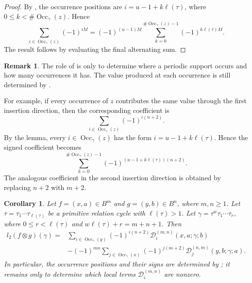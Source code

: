 \documentclass[11pt,a4paper,reqno]{amsart}
\newcommand{\mD}{\mathcal D}
\newcommand{\Occ}{\operatorname{Occ}}
\newcommand{\para}[2]{(#1,#2)}
\theoremstyle{plain}
\newtheorem{corollary}[corollary]{Corollary}
\theoremstyle{definition}
\newtheorem{remark}[remark]{Remark}
\numberwithin{equation}{section}
\begin{document}
	\begin{proof}
		By , the occurrence positions are
		$i=u-1+k\ell(\tau)$, where $0\leq k<\#\Occ_\gamma(z)$.
		Hence
		\[
		\sum_{i\in\Occ_\gamma(z)}(-1)^{iM}
		=
		(-1)^{(u-1)M}
		\sum_{k=0}^{\#\Occ_\gamma(z)-1}
		(-1)^{k\ell(\tau)M}.
		\]
		The result follows by evaluating the final alternating sum.
	\end{proof}
	\begin{remark}
		The role of  is only to determine where a
		periodic support occurs and how many occurrences it has.  The value produced
		at each occurrence is still determined by .
		
		For example, if every occurrence of $z$ contributes the same value through
		the first insertion direction, then the corresponding coefficient is
		\[
		\sum_{i\in\Occ_{\gamma}(z)}
		(-1)^{i(n+2)}.
		\]
		By the lemma, every $i\in\Occ_{\gamma}(z)$ has the form
		$i=u-1+k\ell(\tau)$.
		Hence the signed coefficient becomes
		\[
		\sum_{k=0}^{\#\Occ_{\gamma}(z)-1}
		(-1)^{(u-1+k\ell(\tau))(n+2)}.
		\]
		The analogous coefficient in the second insertion direction is obtained by
		replacing $n+2$ with $m+2$.
	\end{remark}
	\begin{corollary}
		\label{cor:periodic-read-off}
		Let $f=\para{x}{a}\in B^m$ and
		$g=\para{y}{b}\in B^n$, where $m,n\geq1$. 
		Let $\tau=\tau_1\cdots\tau_{\ell(\tau)}$ be a primitive relation cycle
		with $\ell(\tau)>1$.
		Let $\gamma=\tau^w\tau_1\cdots\tau_r$, where
		$0\leq r<\ell(\tau)$ and $w\ell(\tau)+r=m+n+1$.  
		Then
		\begin{align*}
			l_2(f\otimes g)(\gamma)
			={}&
			\sum_{i\in\Occ_\gamma(y)}
			(-1)^{i(n+2)}
			\mD_i^{(m,n)}(x,a;\gamma;b)
			\\
			&-
			(-1)^{mn}
			\sum_{j\in\Occ_\gamma(x)}
			(-1)^{j(m+2)}
			\mD_j^{(n,m)}(y,b;\gamma;a).
		\end{align*}
		In particular, the occurrence positions and their signs are determined by
		; it remains only to determine which local
		terms $\mD_i^{(m,n)}$ are nonzero.
	\end{corollary}
\end{document}
